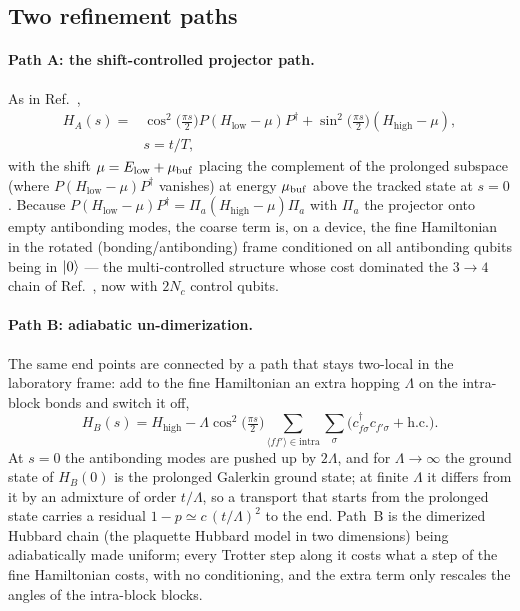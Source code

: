 \documentclass[
  aps,
  prc,
  reprint,
  superscriptaddress,
  floatfix,
  nofootinbib
]{revtex4-2}
\newcommand{\Hlow}{H_{\mathrm{low}}}
\newcommand{\Hhigh}{H_{\mathrm{high}}}
\begin{document}
\subsection{Two refinement paths}
\label{sec:paths}
\paragraph{Path A: the shift-controlled projector path.}
As in Ref.~\cite{EigenQPairing2026},
\begin{align}
  H_A(s)={}&\cos^2\!\big(\tfrac{\pi s}{2}\big)P(\Hlow-\mu)P^\dagger
        +\sin^2\!\big(\tfrac{\pi s}{2}\big)(\Hhigh-\mu),\nonumber\\
        &s=t/T,
  \label{eq:pathA}
\end{align}
with the shift $\mu=E_{\rm low}+\mu_{\rm buf}$ placing the complement of the
prolonged subspace (where $P(\Hlow-\mu)P^\dagger$ vanishes) at energy
$\mu_{\rm buf}$ above the tracked state at $s=0$.  Because
$P(\Hlow-\mu)P^\dagger=\Pi_a(\Hhigh-\mu)\Pi_a$ with $\Pi_a$ the projector onto
empty antibonding modes, the coarse term is, on a device, the fine
Hamiltonian in the rotated (bonding/antibonding) frame conditioned on all
antibonding qubits being in $\ket{0}$ --- the multi-controlled structure whose
cost dominated the $3\to4$ chain of Ref.~\cite{EigenQPairing2026}, now with
$2N_c$ control qubits.

\paragraph{Path B: adiabatic un-dimerization.}
The same end points are connected by a path that stays two-local in the
laboratory frame: add to the fine Hamiltonian an extra hopping $\Lambda$ on
the intra-block bonds and switch it off,
\begin{equation}
  H_B(s)=\Hhigh-\Lambda\cos^2\!\big(\tfrac{\pi s}{2}\big)
  \sum_{\langle ff'\rangle\in\mathrm{intra}}\sum_\sigma
  \big(c^\dagger_{f\sigma}c_{f'\sigma}+\mathrm{h.c.}\big).
  \label{eq:pathB}
\end{equation}
At $s=0$ the antibonding modes are pushed up by $2\Lambda$, and for
$\Lambda\to\infty$ the ground state of $H_B(0)$ is the prolonged Galerkin
ground state; at finite $\Lambda$ it differs from it by an admixture of
order $t/\Lambda$, so a transport that starts from the prolonged state
carries a residual $1-p\simeq c\,(t/\Lambda)^2$ to the end.  Path~B is the
dimerized Hubbard chain (the plaquette Hubbard model in two dimensions)
being adiabatically made uniform; every Trotter step along it costs what a
step of the fine Hamiltonian costs, with no conditioning, and the extra term
only rescales the angles of the intra-block blocks.
\end{document}

